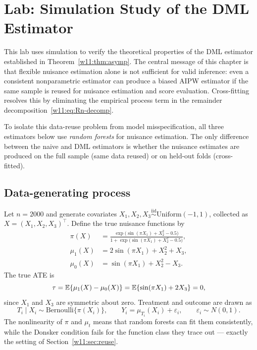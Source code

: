 \documentclass[master.tex]{subfiles}
\begin{document}
\section{Lab: Simulation Study of the DML Estimator}
\label{w11:sec:lab}

This lab uses simulation to verify the theoretical properties of the
DML estimator established in Theorem~\ref{w11:thm:asymp}.  The
central message of this chapter is that flexible nuisance estimation
alone is not sufficient for valid inference: even a consistent
nonparametric estimator can produce a biased AIPW estimator if the
same sample is reused for nuisance estimation and score evaluation.
Cross-fitting resolves this by eliminating the empirical process
term in the remainder decomposition~\eqref{w11:eq:Rn-decomp}.

To isolate this data-reuse problem from model misspecification, all
three estimators below use \emph{random forests} for nuisance
estimation.  The only difference between the naive and DML estimators
is whether the nuisance estimates are produced on the full sample
(same data reused) or on held-out folds (cross-fitted).

\subsection{Data-generating process}
\label{w11:subsec:lab-dgp}

Let $n = 2000$ and generate covariates $X_1, X_2, X_3
\overset{\mathrm{iid}}{\sim} \mathrm{Uniform}(-1, 1)$, collected as
$X = (X_1, X_2, X_3)^\top$.  Define the true nuisance functions by
\begin{align*}
  \pi(X)
  &= \frac{\exp\!\bigl(\sin(\pi X_1) + X_2^2 - 0.5\bigr)}
          {1 + \exp\!\bigl(\sin(\pi X_1) + X_2^2 - 0.5\bigr)}, \\[4pt]
  \mu_1(X) &= 2\sin(\pi X_1) + X_2^2 + X_3, \\[4pt]
  \mu_0(X) &= \sin(\pi X_1) + X_2^2 - X_3.
\end{align*}
The true ATE is
\[
  \tau = \mathbb{E}\{\mu_1(X) - \mu_0(X)\} = \mathbb{E}\{\sin(\pi X_1) + 2X_3\} = 0,
\]
since $X_1$ and $X_3$ are symmetric about zero.  Treatment and
outcome are drawn as
\[
  T_i \mid X_i \sim \mathrm{Bernoulli}\{\pi(X_i)\},
  \qquad
  Y_i = \mu_{T_i}(X_i) + \varepsilon_i,
  \qquad
  \varepsilon_i \sim N(0, 1).
\]
The nonlinearity of $\pi$ and $\mu_t$ means that random forests can
fit them consistently, while the Donsker condition fails for the
function class they trace out — exactly the setting of
Section~\ref{w11:sec:reuse}.
\end{document}
